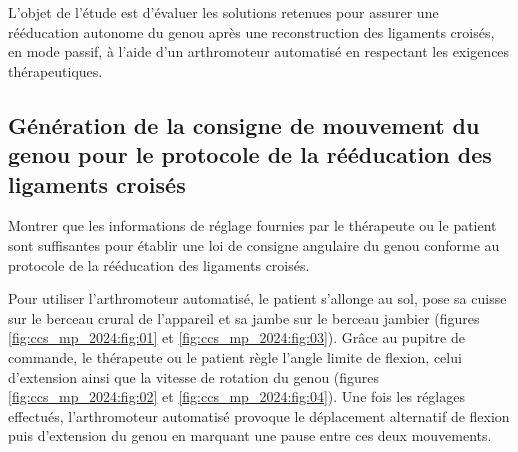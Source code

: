\begin{obj}
L'objet de l'étude est d'évaluer les solutions retenues pour assurer une rééducation autonome du genou après une reconstruction des ligaments croisés, en mode passif, à l'aide d'un arthromoteur automatisé en respectant les exigences thérapeutiques.
\end{obj}

\subsection{Génération de la consigne de mouvement du genou pour le protocole de la rééducation des ligaments croisés}

\begin{obj}
Montrer que les informations de réglage fournies par le thérapeute ou le patient sont suffisantes pour établir une loi de consigne angulaire du genou conforme au protocole de la rééducation des ligaments croisés.
\end{obj}

Pour utiliser l'arthromoteur automatisé, le patient s'allonge au sol, pose sa cuisse sur le berceau crural de l'appareil et sa jambe sur le berceau jambier (figures \ref{fig:ccs_mp_2024:fig:01} et \ref{fig:ccs_mp_2024:fig:03}). Grâce au pupitre de commande, le thérapeute ou le patient règle l'angle limite de flexion, celui d'extension ainsi que la vitesse de rotation du genou (figures \ref{fig:ccs_mp_2024:fig:02} et \ref{fig:ccs_mp_2024:fig:04}). Une fois les réglages effectués, l'arthromoteur automatisé provoque le déplacement alternatif de flexion puis d'extension du genou en marquant une pause entre ces deux mouvements.

